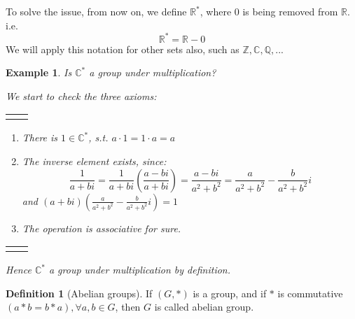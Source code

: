 \documentclass{article}
\theoremstyle{MyNonumberplain}
\theoremstyle{break}
\newcommand{\R}{\mathbb{R}}
\newcommand{\Q}{\mathbb{Q}}
\newcommand{\Z}{\mathbb{Z}}
\newcommand{\C}{\mathbb{C}}
\theoremstyle{break}
\newtheorem{example}{Example}[section]
\theoremstyle{break}
\theoremstyle{definition}
\theoremstyle{break}
\newtheorem{definition}{Definition}[section]
\begin{document}
To solve the issue, from now on, we define $\R^*$, where $0$ is being removed from $\R$. i.e. 
$$\R^*=\R-{0}$$
We will apply this notation for other sets also, such as $\Z,\C,\Q,...$

\begin{expbox}
    \begin{example}
        Is $\C^*$ a group under multiplication?
        \begin{ansbox}
            We start to check the three axioms:

            \begin{tabular}{ll}
                &\\
            \end{tabular}
    
            \begin{enumerate}
                \item There is $1\in \C^*$, s.t. $a\cdot 1=1\cdot a=a$
                \item The inverse element exists, since:
                $$\frac{1}{a+bi}=\frac{1}{a+bi}\left(\frac{a-bi}{a+bi}\right)=\frac{a-bi}{a^2+b^2}=\frac{a}{a^2+b^2}-\frac{b}{a^2+b^2}i$$
                and $(a+bi)\left( \frac{a}{a^2+b^2}-\frac{b}{a^2+b^2}i\right)=1$
                \item The operation is associative for sure.
            \end{enumerate}
    
            \begin{tabular}{ll}
                &\\
            \end{tabular}
    
            Hence $\C^*$ a group under multiplication by definition.
    
        \end{ansbox}
    \end{example}
\end{expbox}

\begin{defbox}
    \begin{definition}[Abelian groups]
        If $(G, \ast)$ is a group, and if $\ast$ is commutative $(a \ast b = b \ast a), \forall a, b \in G$, then $G$ is called abelian group.
    \end{definition}
\end{defbox}
\end{document}
